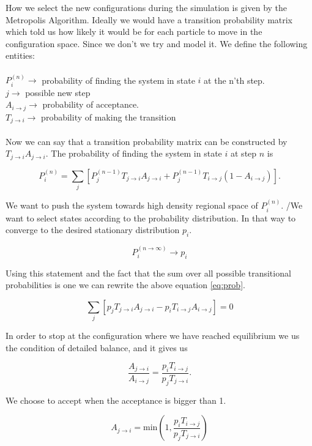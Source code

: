 How we select the new configurations during the simulation is given by the Metropolis Algorithm. 
Ideally we would have a transition probability matrix which told us how likely it would be for each particle to move in the configuration space. Since we don't we try and model it.
We define the following entities:
\\
\\
$P_i^{(n)} \rightarrow$ probability of finding the system in state $i$ at the n'th step.
\\
$j \rightarrow$ possible new step
\\
$A_{i \rightarrow j} \rightarrow$ probability of acceptance. 
\\
$T_{j \rightarrow i} \rightarrow$ probability of making the transition  
\\
\\
Now we can say that a transition probability matrix can be constructed by $T_{j \rightarrow i}A_{j \rightarrow i}.$ The probability of finding the system in state $i$ at step $n$ is

\begin{equation}\label{eq:prob}
P_i^{(n)} = \sum_j \left[P_j^{(n-1)} T_{j \rightarrow i}A_{j \rightarrow i} + P_j^{(n-1)}T_{i \rightarrow j}(1 - A_{i \rightarrow j})\right].
\end{equation}

We want to push the system towards high density regional space of $P_i^{(n)}$. /We want to select states according to the probability distribution. In that way to converge to the desired stationary distribution $p_i$.

$$P_i^{(n \rightarrow \infty)} \rightarrow p_i$$

Using this statement and the fact that the sum over all possible transitional probabilities is one we can rewrite the above equation \ref{eq:prob}.

$$\sum_j [p_j T_{j \rightarrow i}A_{j \rightarrow i} - p_i T_{i \rightarrow j}A_{i \rightarrow j}] = 0$$

In order to stop at the configuration where we have reached equilibrium we us the condition of detailed balance, and it gives us 


$$\frac{A_{j \rightarrow i}}{A_{i \rightarrow j}} = \frac{p_i T_{i \rightarrow j}}{p_j T_{j \rightarrow i}}.$$

We choose to accept when the acceptance is bigger than 1. 

$$A_{j \rightarrow i} = \mathrm{min} \left( 1, \frac{p_i T_{i \rightarrow j}}{p_j T_{j \rightarrow i}}\right)$$

